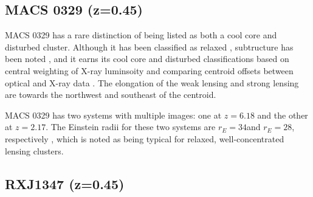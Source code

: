 

\subsection{MACS 0329 (z=0.45)}
\label{sec:results_m0329}


MACS 0329 has a rare distinction of being listed as both a cool core and disturbed cluster. Although it has
been classified as relaxed \citep{schmidt2007}, subtructure has been noted \citep{maughan2008}, and it earns
its cool core and disturbed classifications based on central weighting of X-ray luminsoity and comparing
centroid offsets between optical and X-ray data \citep{sayers2013}. The elongation of the weak lensing and
strong lensing are towards the northwest and southeast of the centroid.

MACS 0329 has two systems with multiple images: one at $z = 6.18$ and the other at $z = 2.17$. The Einstein
radii for these two systems are $r_E = 34$\asecs and $r_E = 28$\asec, respectively \citep{zitrin2012b}, which is
noted as being typical for relaxed, well-concentrated lensing clusters. 




\subsection{RXJ1347 (z=0.45)}
\label{sec:results_rxj1347}

